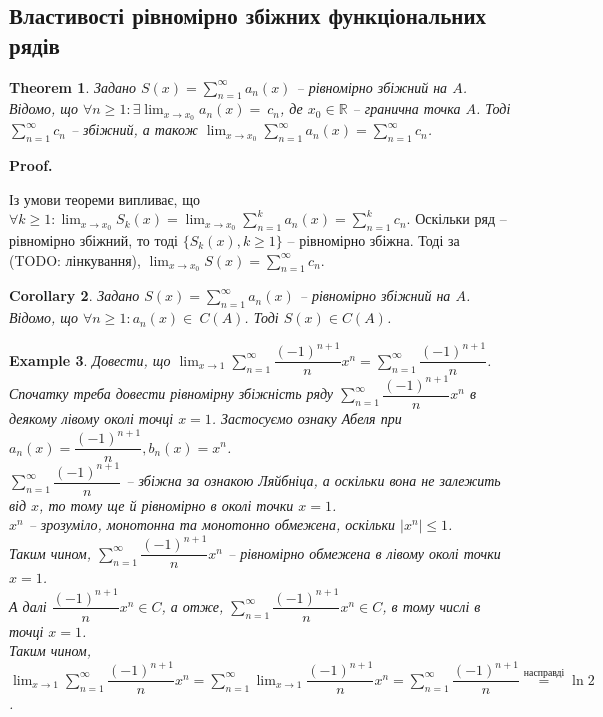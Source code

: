 \documentclass[a4paper, 10pt]{article}
\makeatletter
\def\huge{\displaystyle}
\def\qed{$\blacksquare$}
\theoremstyle{theoremdd}
\newtheorem{theorem}{Theorem}[subsection]
\theoremstyle{theoremdd}
\theoremstyle{theoremdd}
\theoremstyle{theoremdd}
\theoremstyle{theoremdd}
\newtheorem{example}[theorem]{Example}
\theoremstyle{theoremdd}
\theoremstyle{theoremdd}
\theoremstyle{theoremdd}
\theoremstyle{theoremdd}
\newtheorem{corollary}[theorem]{Corollary}
\renewenvironment{proof}[1][Proof.\\]{\par
\pushQED{\hfill \qed}%
\normalfont \topsep6\p@\@plus6\p@\relax
\trivlist
\item\relax
{\bfseries
#1\@addpunct{.}}\hspace\labelsep\ignorespaces
}{%
\popQED\endtrivlist\@endpefalse
}
\makeatother
\begin{document}
\subsection{Властивості рівномірно збіжних функціональних рядів}
\begin{theorem}
Задано $S(x) = \huge\sum_{n=1}^\infty a_n(x)$ -- рівномірно збіжний на $A$. Відомо, що $\forall n \geq 1: \exists \huge\lim_{x \to x_0} a_n(x) = ~{c_n}$, де $x_0 \in \mathbb{R}$ -- гранична точка $A$. Тоді $\huge\sum_{n=1}^\infty c_n$ -- збіжний, а також $\huge\lim_{x \to x_0} \sum_{n=1}^\infty a_n(x) = \sum_{n=1}^\infty c_n$.
\end{theorem}

\begin{proof}
Із умови теореми випливає, що $\forall k \geq 1: \huge\lim_{x \to x_0} S_k(x) = \lim_{x \to x_0} \huge\sum_{n=1}^k a_n(x) = \huge\sum_{n=1}^k c_n$. Оскільки ряд -- рівномірно збіжний, то тоді $\{S_k(x), k \geq 1\}$ -- рівномірно збіжна. Тоді за (TODO: лінкування),  $\huge\lim_{x \to x_0} S(x) = \sum_{n=1}^\infty c_n$.
\end{proof}

\begin{corollary}
Задано $S(x) = \huge \sum_{n=1}^\infty a_n(x)$ -- рівномірно збіжний на $A$. Відомо, що $\forall n \geq 1: a_n(x) \in ~{C(A)}$. Тоді $S(x) \in C(A)$.
\end{corollary}

\iffalse
\begin{proof}
З умови теореми випливає, що $\forall k \geq 1: S_k(x) = \huge \sum_{n=1}^k a_n(x) \in C(A)$ як сума неперервних функцій\\
Оскільки ряд - рівномірно збіжний, то тоді $\{S_k(x), k \geq 1\}$ - рівномірно збіжна. Тоді за \textbf{Th. 10.?}, $S(x) \in C(A)$.
\end{proof}
\fi

\begin{example}
Довести, що $\huge\lim_{x \to 1} \huge\sum_{n=1}^\infty \dfrac{(-1)^{n+1}}{n}x^n = \sum_{n=1}^\infty\dfrac{(-1)^{n+1}}{n}$.\\
Спочатку треба довести рівномірну збіжність ряду $\huge\sum_{n=1}^\infty \dfrac{(-1)^{n+1}}{n} x^n$ в деякому лівому околі точці $x = 1$. Застосуємо ознаку Абеля при $a_n(x) = \dfrac{(-1)^{n+1}}{n}, b_n(x) = x^n$.\\
$\huge\sum_{n=1}^\infty \dfrac{(-1)^{n+1}}{n}$ -- збіжна за ознакою Ляйбніца, а оскільки вона не залежить від $x$, то тому ще й рівномірно в околі точки $x = 1$.\\
$x^n$ -- зрозуміло, монотонна та монотонно обмежена, оскільки $|x^n| \leq 1$.\\
Таким чином, $\huge\sum_{n=1}^\infty \dfrac{(-1)^{n+1}}{n} x^n$ -- рівномірно обмежена в лівому околі точки $x=1$.\\
А далі $\dfrac{(-1)^{n+1}}{n} x^{n} \in C$, а отже, $\huge\sum_{n=1}^\infty \dfrac{(-1)^{n+1}}{n}x^n \in C$, в тому числі в точці $x=1$.\\
Таким чином, $\huge\lim_{x \to 1} \huge\sum_{n=1}^\infty \dfrac{(-1)^{n+1}}{n}x^n = \huge\sum_{n=1}^\infty \lim_{x \to 1}\dfrac{(-1)^{n+1}}{n}x^n = \sum_{n=1}^\infty \dfrac{(-1)^{n+1}}{n} \overset{\text{насправді}}{=} \ln 2$.
\end{example}
\end{document}
